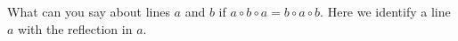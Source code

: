 What can you say about lines $a$ and $b$ if $a \circ b \circ a = b \circ a \circ b$. Here we identify a line $a$ with the reflection in $a$.
